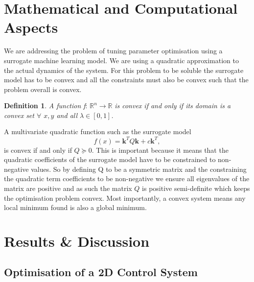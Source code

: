 \documentclass[conference]{IEEEtran}
\theoremstyle{definition}
\newtheorem{definition}{Definition}[section]
\begin{document}
\section{Mathematical and Computational Aspects}
\noindent We are addressing the problem of tuning parameter optimisation using a surrogate machine learning model. We are using a quadratic approximation to the actual dynamics of the system. For this problem to be soluble the surrogate model has to be convex and all the constraints must also be convex such that the problem overall is convex. \\
\theoremstyle{definition}
\begin{definition}
\textit{A function f}: $\mathbb{R}^n \rightarrow \mathbb{R}$ \textit{is convex if and only if its domain is a convex set $\forall$ $x, y$ and all $\lambda \in [0,1]$. } 
\end{definition}
\noindent A multivariate quadratic function such as the surrogate model
\begin{equation}
    f(x) = \mathbf{k}^TQ\mathbf{k} + c\mathbf{k}^T,
\end{equation}
is convex if and only if $Q \succcurlyeq 0$. This is important because it means that the quadratic coefficients of the surrogate model have to be constrained to non-negative values. So by defining Q to be a symmetric matrix and the constraining the quadratic term coefficients to be non-negative we ensure all eigenvalues of the matrix are positive and as such the matrix $Q$ is positive semi-definite which keeps the optimisation problem convex. Most importantly, a convex system means any local minimum found is also a global minimum. 


\section{Results \& Discussion}
\subsection{Optimisation of a 2D Control System}
\end{document}
